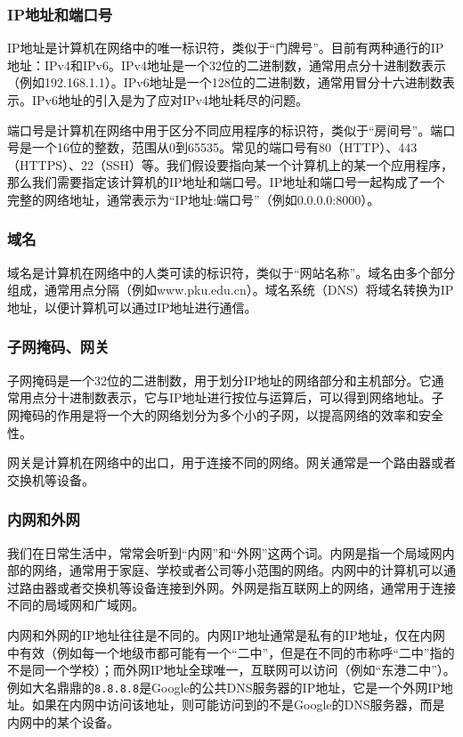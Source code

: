 \subsubsection{IP地址和端口号}
IP地址是计算机在网络中的唯一标识符，类似于“门牌号”。目前有两种通行的IP地址：IPv4和IPv6。IPv4地址是一个32位的二进制数，通常用点分十进制数表示（例如192.168.1.1）。IPv6地址是一个128位的二进制数，通常用冒分十六进制数表示。IPv6地址的引入是为了应对IPv4地址耗尽的问题。

端口号是计算机在网络中用于区分不同应用程序的标识符，类似于“房间号”。端口号是一个16位的整数，范围从0到65535。常见的端口号有80（HTTP）、443（HTTPS）、22（SSH）等。我们假设要指向某一个计算机上的某一个应用程序，那么我们需要指定该计算机的IP地址和端口号。IP地址和端口号一起构成了一个完整的网络地址，通常表示为“IP地址:端口号”（例如0.0.0.0:8000）。

\subsubsection{域名}
域名是计算机在网络中的人类可读的标识符，类似于“网站名称”。域名由多个部分组成，通常用点分隔（例如www.pku.edu.cn）。域名系统（DNS）将域名转换为IP地址，以便计算机可以通过IP地址进行通信。

\subsubsection{子网掩码、网关}

子网掩码是一个32位的二进制数，用于划分IP地址的网络部分和主机部分。它通常用点分十进制数表示，它与IP地址进行按位与运算后，可以得到网络地址。子网掩码的作用是将一个大的网络划分为多个小的子网，以提高网络的效率和安全性。

网关是计算机在网络中的出口，用于连接不同的网络。网关通常是一个路由器或者交换机等设备。

\subsubsection{内网和外网}

我们在日常生活中，常常会听到“内网”和“外网”这两个词。内网是指一个局域网内部的网络，通常用于家庭、学校或者公司等小范围的网络。内网中的计算机可以通过路由器或者交换机等设备连接到外网。外网是指互联网上的网络，通常用于连接不同的局域网和广域网。

内网和外网的IP地址往往是不同的。内网IP地址通常是私有的IP地址，仅在内网中有效（例如每一个地级市都可能有一个“二中”，但是在不同的市称呼“二中”指的不是同一个学校）；而外网IP地址全球唯一，互联网可以访问（例如“东港二中”）。例如大名鼎鼎的\texttt{8.8.8.8}是Google的公共DNS服务器的IP地址，它是一个外网IP地址。如果在内网中访问该地址，则可能访问到的不是Google的DNS服务器，而是内网中的某个设备。

